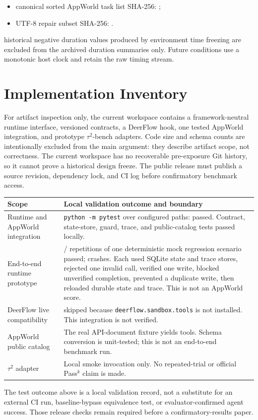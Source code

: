 \begingroup
\raggedright
\begin{itemize}[leftmargin=*,itemsep=2pt]
  \item canonical sorted AppWorld task list SHA-256:
        \texttt{\AWTaskListHashDisplay};
  \item UTF-8 repair subset SHA-256:
        \texttt{\AWRepairListHashDisplay}.
\end{itemize}
\endgroup

\AWInvalidDurationCount{} historical negative duration values produced by environment time freezing
are excluded from the archived duration summaries only. Future conditions use a
monotonic host clock and retain the raw timing stream.

\section{Implementation Inventory}
\label{app:implementation}

For artifact inspection only, the current workspace contains a framework-neutral
runtime interface, versioned contracts, a DeerFlow hook, one tested AppWorld
integration, and prototype $\tau^2$-bench adapters. Code size and schema counts
are intentionally excluded from the main argument: they describe artifact scope,
not correctness. The current workspace has
no recoverable pre-exposure Git history, so it cannot prove a historical design
freeze. The public release must publish a source revision, dependency lock, and
CI log before confirmatory benchmark access.

\begin{center}
\small
\begin{tabularx}{\linewidth}{@{}lY@{}}
\toprule
Scope & Local validation outcome and boundary \\
\midrule
Runtime and AppWorld integration & \texttt{python -m pytest} over configured paths: \LocalUnitTestPassed{} passed. Contract, state-store, guard, trace, and public-catalog tests passed locally. \\
End-to-end runtime prototype & \PrototypeValidationPassed{}/\PrototypeValidationRepetitionCount{} repetitions of one deterministic mock regression scenario passed; \PrototypeValidationCrashes{} crashes. Each used SQLite state and trace stores, rejected one invalid call, verified one write, blocked unverified completion, prevented a duplicate write, then reloaded durable state and trace. This is not an AppWorld score. \\
DeerFlow live compatibility & \LocalUnitTestSkipped{} skipped because \texttt{deerflow.sandbox.tools} is not installed. This integration is not verified. \\
AppWorld public catalog & The real API-document fixture yields \AppWorldCatalogToolCount{} tools. Schema conversion is unit-tested; this is not an end-to-end benchmark run. \\
$\tau^2$ adapter & Local smoke invocation only. No repeated-trial or official Pass$^k$ claim is made. \\
\bottomrule
\end{tabularx}
\end{center}

The test outcome above is a local validation record, not a substitute for an
external CI run, baseline-bypass equivalence test, or evaluator-confirmed agent
success. Those release checks remain required before a confirmatory-results paper.
